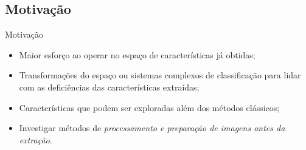 \documentclass{beamer}
\begin{document}
\subsection{Motivação}
\begin{frame}{Motivação}
  \setlength\leftmargini{1em}
  \justifying
  \begin{itemize}
    \item Maior esforço ao operar no espaço de características já obtidas;
    \item Transformações do espaço ou sistemas complexos de classificação para lidar com as deficiências das características extraídas;
    \item Características que podem ser exploradas além dos métodos clássicos;
    \item Investigar métodos de \textit{processamento e preparação de imagens antes da extração}.
  \end{itemize}
\end{frame}
\end{document}
